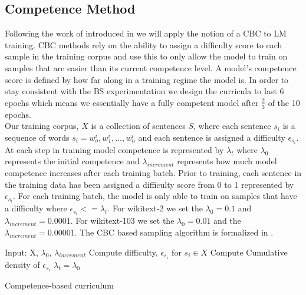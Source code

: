 \subsection{Competence Method}
Following the work of \cite{Platanios2019CompetencebasedCL} introduced in  we will apply the notion of a CBC to LM training. CBC methods rely on the ability to assign a difficulty score to each sample in the training corpus and use this to only allow the model to train on samples that are easier than its current competence level. A model's competence score is defined by how far along in a training regime the model is. In order to stay consistent with the BS experimentation we design the curricula to last 6 epochs which means we essentially have a fully competent model after $\frac{2}{3}$ of the 10 epochs. \\
Our training corpus, $X$ is a collection of sentences $S$, where each sentence $s_i$ is a sequence of words $s_i= w_o^i,w_1^i,...,w_n^i$ and each sentence is assigned a difficulty $\epsilon_{s_i}$. At each step in training model competence is represented by $\lambda_t$ where $\lambda_0$ represents the initial competence and $\lambda_{increment}$ represents how much model competence increases after each training batch. Prior to training, each sentence in the training data has been assigned a difficulty score from 0 to 1 represented by $\epsilon_{s_i}$. For each training batch, the model is only able to train on samples that have a difficulty where $\epsilon_{s_i} <= \lambda_t$. For wikitext-2 we set the $\lambda_0 = 0.1$ and $\lambda_{increment} = 0.0001$. For wikitext-103 we set the $\lambda_0 = 0.01$ and the $\lambda_{increment} = 0.00001$. The CBC based sampling algorithm is formalized in . \\
\begin{algorithm}[H]
\label{algo:competence}
\SetAlgoLined
{}
Input: X, $\lambda_0$, $\lambda_{increment}$ \;
Compute difficulty, $\epsilon_{s_i}$ for $s_i \in X$\;
Compute Cumulative density of $\epsilon_{s_i}$\;
$\lambda_t = \lambda_0$\;
\caption{Competence-based curriculum}
\end{algorithm}
